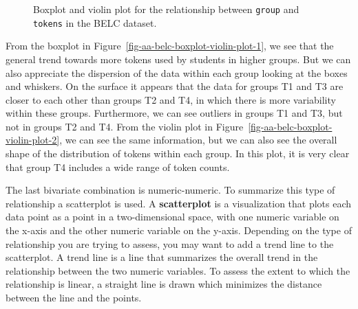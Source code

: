 \documentclass[
  letterpaper,
  DIV=11,
  numbers=noendperiod]{scrreprt}
\theoremstyle{definition}
\theoremstyle{remark}
\begin{document}
\begin{figure}[H]

\begin{minipage}{0.50\linewidth}



\end{minipage}%
%
\begin{minipage}{0.50\linewidth}



\end{minipage}%

\caption{\label{fig-aa-belc-boxplot-violin-plot}Boxplot and violin plot
for the relationship between \texttt{group} and \texttt{tokens} in the
BELC dataset.}

\end{figure}%

From the boxplot in Figure~\ref{fig-aa-belc-boxplot-violin-plot-1}, we
see that the general trend towards more tokens used by students in
higher groups. But we can also appreciate the dispersion of the data
within each group looking at the boxes and whiskers. On the surface it
appears that the data for groups T1 and T3 are closer to each other than
groups T2 and T4, in which there is more variability within these
groups. Furthermore, we can see outliers in groups T1 and T3, but not in
groups T2 and T4. From the violin plot in
Figure~\ref{fig-aa-belc-boxplot-violin-plot-2}, we can see the same
information, but we can also see the overall shape of the distribution
of tokens within each group. In this plot, it is very clear that group
T4 includes a wide range of token counts.

The last bivariate combination is numeric-numeric. To summarize this
type of relationship a scatterplot is used. A \textbf{scatterplot} is a
visualization that plots each data point as a point in a two-dimensional
space, with one numeric variable on the x-axis and the other numeric
variable on the y-axis. Depending on the type of relationship you are
trying to assess, you may want to add a trend line to the scatterplot. A
trend line is a line that summarizes the overall trend in the
relationship between the two numeric variables. To assess the extent to
which the relationship is linear, a straight line is drawn which
minimizes the distance between the line and the points.
\end{document}
